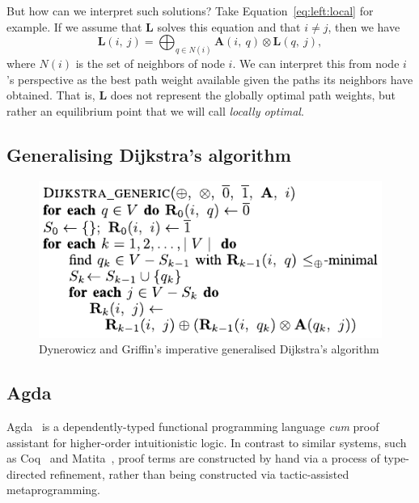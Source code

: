 But how can we interpret such solutions?
Take Equation~\ref{eq:left:local} for example.
If we assume that $\mathbf{L}$ solves this equation
and that $i \neq j$, then we have
\begin{equation}
\label{eq:left:local:at:i}
\mathbf{L}(i,\ j) = \displaystyle\bigoplus_{q \in N(i)} \mathbf{A}(i,\ q) \otimes \mathbf{L}(q,\ j),
\end{equation}
where $N(i)$ is the set of neighbors of node $i$.
We can interpret this from node $i$'s perspective as
the best path weight available given the paths its neighbors
have obtained.
That is, $\mathbf{L}$ does not represent the globally optimal
path weights, but rather an equilibrium point that we will
call \emph{locally optimal}.

\subsection{Generalising Dijkstra's algorithm}

\begin{figure}[ht]
\includegraphics{algorithm.pdf}
\caption{Dynerowicz and Griffin's imperative generalised Dijkstra's algorithm}
\label{fig.algorithm}
\end{figure}


\subsection{Agda}
\label{subsect.agda}

Agda~\cite{norell_dependently_2009} is a dependently-typed functional programming language \emph{cum} proof assistant for higher-order intuitionistic logic.
In contrast to similar systems, such as Coq~\cite{bertot_short_2008} and Matita~\cite{asperti_matita_2011}, proof terms are constructed by hand via a process of type-directed refinement, rather than being constructed via tactic-assisted metaprogramming.

